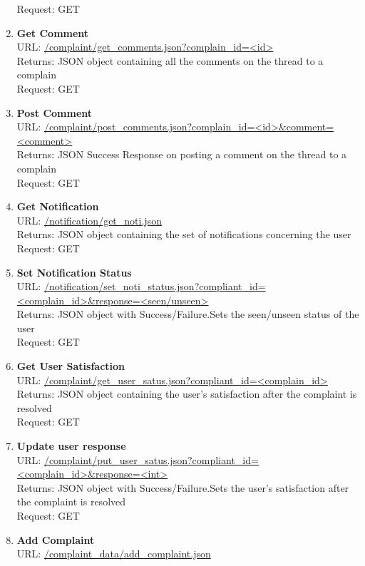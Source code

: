 \documentclass{article}
\begin{document}
\begin{enumerate}
						Request: GET 
					\item \textbf{Get Comment} \\
						URL: \url{/complaint/get_comments.json?complain_id=<id>}\\
						Returns:  JSON object containing all the comments on the thread to a complain\\
						Request: GET
					\item \textbf{Post Comment} \\
						URL: \url{/complaint/post_comments.json?complain_id=<id>&comment=<comment>}\\
						Returns: JSON Success Response on posting a comment on the thread to a complain\\
						Request: GET
					\item \textbf{Get Notification} \\
						URL: \url{/notification/get_noti.json}\\
						Returns: JSON object containing the set of notifications concerning the user\\
						Request: GET
					\item \textbf{Set Notification Status} \\
						URL: \url{/notification/set_noti_status.json?compliant_id=<complain_id>&response=<seen/unseen>}\\
						Returns: JSON object with Success/Failure.Sets the seen/unseen status of the user\\
						Request: GET
					\item \textbf{Get User Satisfaction} \\
						URL: \url{/complaint/get_user_satus.json?compliant_id=<complain_id>}\\
						Returns: JSON object containing the user's satisfaction after the complaint is resolved\\
						Request: GET
					\item \textbf{Update user response} \\
						URL: \url{/complaint/put_user_satus.json?compliant_id=<complain_id>&response=<int>}\\
						Returns: JSON object with Success/Failure.Sets the user's satisfaction after the complaint is resolved\\
						Request: GET
					\item \textbf{Add Complaint} \\
						URL: \url{/complaint_data/add_complaint.json}\\

\end{enumerate}
\end{document}
